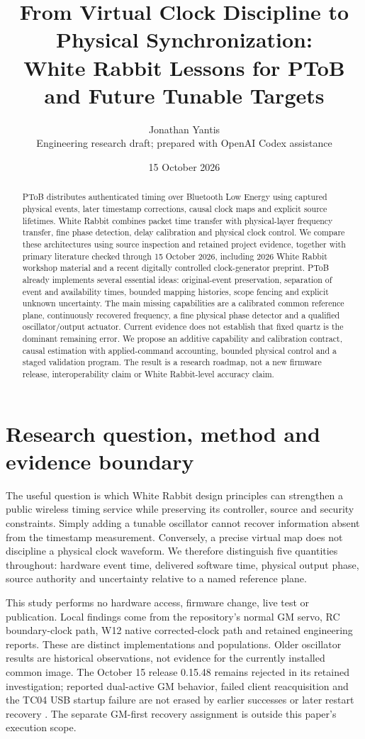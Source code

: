 \documentclass[11pt,letterpaper]{article}
\title{From Virtual Clock Discipline to Physical Synchronization:\\White Rabbit Lessons for PToB and Future Tunable Targets}
\author{Jonathan Yantis\\\small Engineering research draft; prepared with OpenAI Codex assistance}
\date{15 October 2026}
\begin{document}
\maketitle
\begin{abstract}
PToB distributes authenticated timing over Bluetooth Low Energy using captured physical events, later timestamp corrections, causal clock maps and explicit source lifetimes. White Rabbit combines packet time transfer with physical-layer frequency transfer, fine phase detection, delay calibration and physical clock control. We compare these architectures using source inspection and retained project evidence, together with primary literature checked through 15 October 2026, including 2026 White Rabbit workshop material and a recent digitally controlled clock-generator preprint. PToB already implements several essential ideas: original-event preservation, separation of event and availability times, bounded mapping histories, scope fencing and explicit unknown uncertainty. The main missing capabilities are a calibrated common reference plane, continuously recovered frequency, a fine physical phase detector and a qualified oscillator/output actuator. Current evidence does not establish that fixed quartz is the dominant remaining error. We propose an additive capability and calibration contract, causal estimation with applied-command accounting, bounded physical control and a staged validation program. The result is a research roadmap, not a new firmware release, interoperability claim or White Rabbit-level accuracy claim.
\end{abstract}

\section{Research question, method and evidence boundary}
The useful question is which White Rabbit design principles can strengthen a public wireless timing service while preserving its controller, source and security constraints. Simply adding a tunable oscillator cannot recover information absent from the timestamp measurement. Conversely, a precise virtual map does not discipline a physical clock waveform. We therefore distinguish five quantities throughout: hardware event time, delivered software time, physical output phase, source authority and uncertainty relative to a named reference plane.

This study performs no hardware access, firmware change, live test or publication. Local findings come from the repository's normal GM servo, RC boundary-clock path, W12 native corrected-clock path and retained engineering reports. These are distinct implementations and populations. Older oscillator results are historical observations, not evidence for the currently installed common image. The October 15 release 0.15.48 remains rejected in its retained investigation; reported dual-active GM behavior, failed client reacquisition and the TC04 USB startup failure are not erased by earlier successes or later restart recovery \cite{regression}. The separate GM-first recovery assignment is outside this paper's execution scope.
\end{document}
